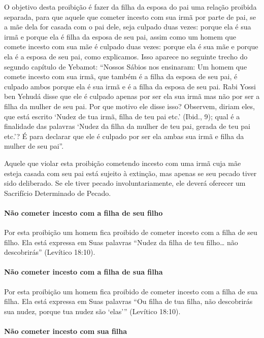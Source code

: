O objetivo desta proibição é fazer da filha da esposa do pai uma relação
proibida separada, para que aquele que cometer incesto com sua irmã por
parte de pai, se a mãe dela for casada com o pai dele, seja culpado duas
vezes: porque ela é sua irmã e porque ela é filha da esposa de seu pai,
assim como um homem que comete incesto com sua mãe é culpado duas vezes:
porque ela é sua mãe e porque ela é a esposa de seu pai, como
explicamos. Isso aparece no seguinte trecho do segundo capítulo de
Yebamot: ``Nossos Sábios nos ensinaram: Um homem que comete incesto com
sua irmã, que também é a filha da esposa de seu pai, é culpado ambos
porque ela é sua irmã e é a filha da esposa de seu pai. Rabi Yossi ben
Yehudá disse que ele é culpado apenas por ser ela sua irmã mas não por
ser a filha da mulher de seu pai. Por que motivo ele disse isso?
Observem, diriam eles, que está escrito `Nudez de tua irmã, filha de teu
pai etc.' (Ibid., 9); qual é a finalidade das palavras `Nudez da filha
da mulher de teu pai, gerada de teu pai etc.'? É para declarar que ele
é culpado por ser ela ambas sua irmã e filha da mulher de seu pai''.

Aquele que violar esta proibição cometendo incesto com uma irmã cuja mãe
esteja casada com seu pai está sujeito à extinção, mas apenas se seu
pecado tiver sido deliberado. Se ele tiver pecado involuntariamente, ele
deverá oferecer um Sacrifício Determinado de Pecado.

\paragraph{Não cometer incesto com a filha de seu filho}

Por esta proibição um homem fica proibido de cometer incesto com a filha
de seu filho. Ela está expressa em Suas palavras ``Nudez da filha de teu
filho\ldots{} não descobrirás'' (Levítico 18:10).

\paragraph{Não cometer incesto com a filha de sua filha}

Por esta proibição um homem fica proibido de cometer incesto com a filha
de sua filha. Ela está expressa em Suas palavras ``Ou filha de tua
filha, não descobrirás sua nudez, porque tua nudez são `elas'''
(Levítico 18:10).

\paragraph{Não cometer incesto com sua filha}


